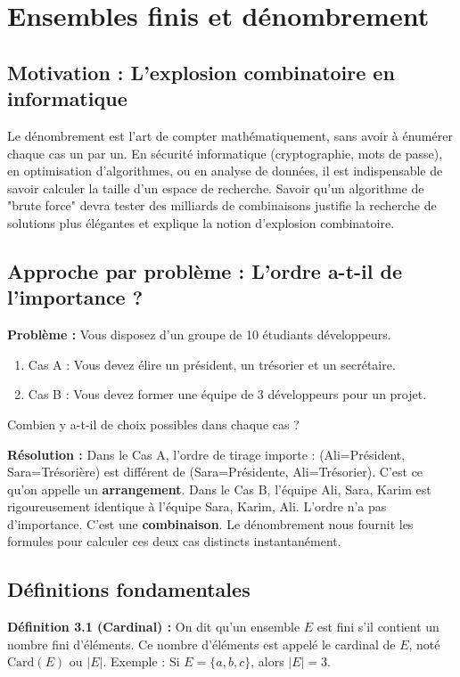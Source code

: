 \section{Ensembles finis et dénombrement}

\subsection{Motivation : L'explosion combinatoire en informatique}
Le dénombrement est l'art de compter mathématiquement, sans avoir à énumérer chaque cas un par un. En sécurité informatique (cryptographie, mots de passe), en optimisation d'algorithmes, ou en analyse de données, il est indispensable de savoir calculer la taille d'un espace de recherche. Savoir qu'un algorithme de "brute force" devra tester des milliards de combinaisons justifie la recherche de solutions plus élégantes et explique la notion d'explosion combinatoire.

\subsection{Approche par problème : L'ordre a-t-il de l'importance ?}
\textbf{Problème :} Vous disposez d'un groupe de 10 étudiants développeurs. 
\begin{enumerate}
    \item Cas A : Vous devez élire un président, un trésorier et un secrétaire.
    \item Cas B : Vous devez former une équipe de 3 développeurs pour un projet.
\end{enumerate}
Combien y a-t-il de choix possibles dans chaque cas ?

\textbf{Résolution :} 
Dans le Cas A, l'ordre de tirage importe : (Ali=Président, Sara=Trésorière) est différent de (Sara=Présidente, Ali=Trésorier). C'est ce qu'on appelle un \textbf{arrangement}.
Dans le Cas B, l'équipe {Ali, Sara, Karim} est rigoureusement identique à l'équipe {Sara, Karim, Ali}. L'ordre n'a pas d'importance. C'est une \textbf{combinaison}.
Le dénombrement nous fournit les formules pour calculer ces deux cas distincts instantanément.

\subsection{Définitions fondamentales}

\textbf{Définition 3.1 (Cardinal) :} 
On dit qu'un ensemble $E$ est fini s'il contient un nombre fini d'éléments. Ce nombre d'éléments est appelé le cardinal de $E$, noté $\text{Card}(E)$ ou $|E|$.
Exemple : Si $E = \{a, b, c\}$, alors $|E| = 3$.

